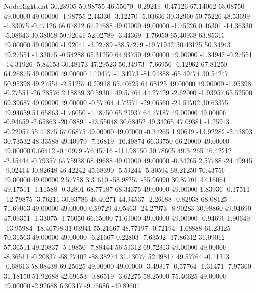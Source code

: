 \begin{filecontents}{NodeRight.dat}
  30.28905   50.98755   46.55670    -0.29219   -0.47126   67.14062   68.08750   49.00000   49.00000   -1.98755    2.44330   -3.12270   -5.03636
  30.32960   50.75226   48.53699    -1.33075   -0.47126   66.07812   67.24688   49.00000   49.00000   -1.75226    0.46301  -14.36330   -5.08643
  30.38068   50.92041   52.02789    -3.44369   -1.76050   65.40938   63.85313   49.00000   49.00000   -1.92041   -3.02789  -38.57279  -19.71942
  30.43125   50.34943   49.27551    -1.33075   -0.54288   65.31250   64.93750   49.00000   49.00000   -1.34943   -0.27551  -14.31926   -5.84153
  30.48173   47.29523   50.34973    -7.66956   -6.12962   67.81250   64.26875   49.00000   49.00000    1.70477   -1.34973  -81.94888  -65.49474
  30.54247   50.95398   49.27551    -2.51257    0.20918   65.40625   64.68125   49.00000   49.00000   -1.95398   -0.27551  -26.28576    2.18839
  30.59301   49.57764   44.27429    -2.62000   -1.93957   65.52500   69.39687   49.00000   49.00000   -0.57764    4.72571  -29.06560  -21.51702
  30.63375   49.94659   51.65863    -1.76050   -1.18750   65.20937   64.77187   49.00000   49.00000   -0.94659   -2.65863  -20.08891  -13.55048
  30.68452   49.34265   47.09381    -1.25913   -0.22057   65.41875   67.06875   49.00000   49.00000   -0.34265    1.90619  -13.92282   -2.43893
  30.73532   48.33588   49.40979    -7.16819  -10.49874   66.33750   66.20000   49.00000   49.00000    0.66412   -0.40979  -76.45716 -111.98150
  30.78605   49.34265   46.42212    -2.15444   -0.79357   65.75938   68.49688   49.00000   49.00000   -0.34265    2.57788  -24.49945   -9.02414
  30.82648   46.42242   45.68390    -5.59244   -5.30594   68.21250   70.43750   49.00000   49.00000    2.57758    3.31610  -58.98257  -55.96090
  30.87701   47.16064   49.17511    -1.11588   -0.32801   68.77187   68.34375   49.00000   49.00000    1.83936   -0.17511  -12.79875   -3.76211
  30.93786   48.40271   44.94537    -2.26188   -0.82938   68.08125   71.69063   49.00000   49.00000    0.59729    4.05463  -24.27973   -8.90283
  30.98860   49.94690   47.09351    -1.33075   -1.76050   66.65000   71.60000   49.00000   49.00000   -0.94690    1.90649  -13.95984  -18.46798
  31.03941   55.21667   48.77197    -0.72194   -1.68888   61.23125   70.31563   49.00000   49.00000   -6.21667    0.22803   -7.63592  -17.86312
  31.09012   57.36511   49.20837    -5.19850   -7.88444   56.50312   69.72813   49.00000   49.00000   -8.36511   -0.20837  -58.27402  -88.38274
  31.13077   52.49817   49.57764    -0.11313   -0.68613   58.08438   69.25625   49.00000   49.00000   -3.49817   -0.57764   -1.31471   -7.97360
  31.18150   51.92688   42.69653    -0.86519   -3.62275   58.25000   75.40625   49.00000   49.00000   -2.92688    6.30347   -9.76686  -40.89601

\end{filecontents}
